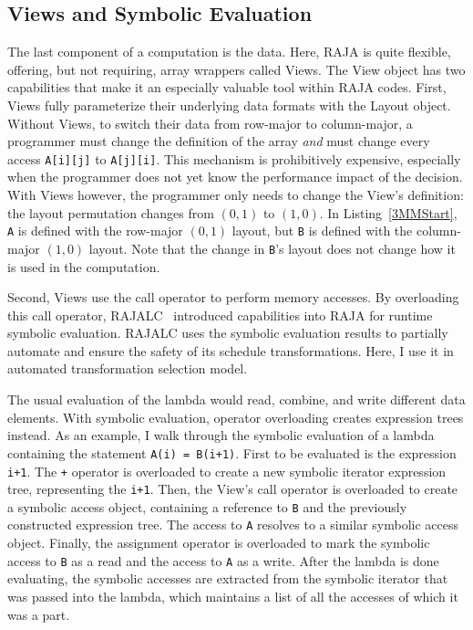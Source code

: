 \subsection{Views and Symbolic Evaluation}

The last component of a computation is the data.
Here, RAJA is quite flexible, offering, but not requiring, array wrappers called Views.
The View object has two capabilities that make it an especially valuable tool within RAJA codes.
First, Views fully parameterize their underlying data formats with the Layout object.
Without Views, to switch their data from row-major to column-major, a programmer must change the definition of the array \textit{and} must change every access \verb.A[i][j]. to \verb.A[j][i]..
This mechanism is prohibitively expensive, especially when the programmer does not yet know the performance impact of the decision.
With Views however, the programmer only needs to change the View's definition: the layout permutation changes from $(0,1)$ to $(1,0)$. 
In Listing~\ref{3MMStart}, \verb.A. is defined with the row-major $(0,1)$ layout, but \verb.B. is defined with the column-major $(1,0)$ layout. 
Note that the change in \verb.B.'s layout does not change how it is used in the computation. 

Second, Views use the call operator to perform memory accesses. 
By overloading this call operator, RAJALC~\cite{neth2021inter} introduced capabilities into RAJA for runtime symbolic evaluation.
RAJALC uses the symbolic evaluation results to partially automate and ensure the safety of its schedule transformations.
Here, I use it in automated transformation selection model.

The usual evaluation of the lambda would read, combine, and write different data elements.
With symbolic evaluation, operator overloading creates expression trees instead.
As an example, I walk through the symbolic evaluation of a lambda containing the statement \verb.A(i) = B(i+1)..
First to be evaluated is the expression \verb.i+1.. 
The \verb.+. operator is overloaded to create a new symbolic iterator expression tree, representing the \verb.i+1.. 
Then, the View's call operator is overloaded to create a symbolic access object, containing a reference to \verb.B. and the previously constructed expression tree.
The access to \verb.A. resolves to a similar symbolic access object.
Finally, the assignment operator is overloaded to mark the symbolic access to \verb.B. as a read and the access to \verb.A. as a write.
After the lambda is done evaluating, the symbolic accesses are extracted from the symbolic iterator that was passed into the lambda, which maintains a list of all the accesses of which it was a part.

